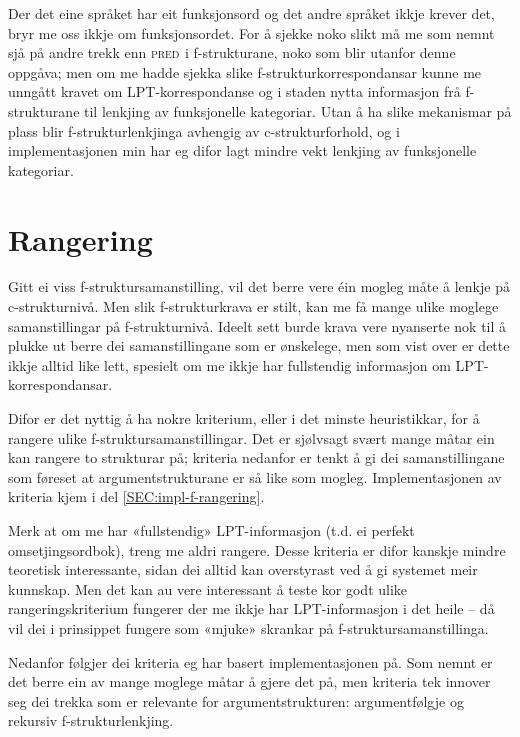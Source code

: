 \documentclass[11pt,a4paper,oneside,draft]{report}
\newcommand{\F}[2]{\textsc{#1}\ensuremath{_{#2}}}
\newcommand{\PRED}{\F{pred}{}}
\begin{document}
Der det eine språket har eit funksjonsord og det andre språket ikkje
krever det, bryr me oss ikkje om funksjonsordet. For å sjekke noko
slikt må me som nemnt sjå på andre trekk enn \PRED{} i f-strukturane,
noko som blir utanfor denne oppgåva; men om me hadde sjekka slike
f-strukturkorrespondansar kunne me unngått kravet om
LPT-korrespondanse og i staden nytta informasjon frå f-strukturane til
lenkjing av funksjonelle kategoriar. Utan å ha slike mekanismar på
plass blir f-strukturlenkjinga avhengig av c-strukturforhold, og i
implementasjonen min har eg difor lagt mindre vekt lenkjing av
funksjonelle kategoriar.

\section{Rangering}
\label{sec-3.8}

   \label{SEC:rangering}

Gitt ei viss f-struktursamanstilling, vil det berre vere éin mogleg
måte å lenkje på c-strukturnivå. Men slik f-strukturkrava er stilt,
kan me få mange ulike moglege samanstillingar på
f-strukturnivå. Ideelt sett burde krava vere nyanserte nok til å
plukke ut berre dei samanstillingane som er ønskelege, men som vist
over er dette ikkje alltid like lett, spesielt om me ikkje har
fullstendig informasjon om LPT-korrespondansar.

Difor er det nyttig å ha nokre kriterium, eller i det minste
heuristikkar, for å rangere ulike f-struktursamanstillingar. Det er
sjølvsagt svært mange måtar ein kan rangere to strukturar på; kriteria
nedanfor er tenkt å gi dei samanstillingane som føreset at
argumentstrukturane er så like som mogleg. Implementasjonen av
kriteria kjem i del \ref{SEC:impl-f-rangering}.

Merk at om me har «fullstendig» LPT-informasjon (t.d. ei perfekt
omsetjingsordbok), treng me aldri rangere. Desse kriteria er difor
kanskje mindre teoretisk interessante, sidan dei alltid kan
overstyrast ved å gi systemet meir kunnskap. Men det kan au vere
interessant å teste kor godt ulike rangeringskriterium fungerer der me
ikkje har LPT-informasjon i det heile -- då vil dei i prinsippet
fungere som «mjuke» skrankar på f-struktursamanstillinga.

Nedanfor følgjer dei kriteria eg har basert implementasjonen på. Som
nemnt er det berre ein av mange moglege måtar å gjere det på, men
kriteria tek innover seg dei trekka som er relevante for
argumentstrukturen: argumentfølgje og rekursiv f-strukturlenkjing.
\end{document}
